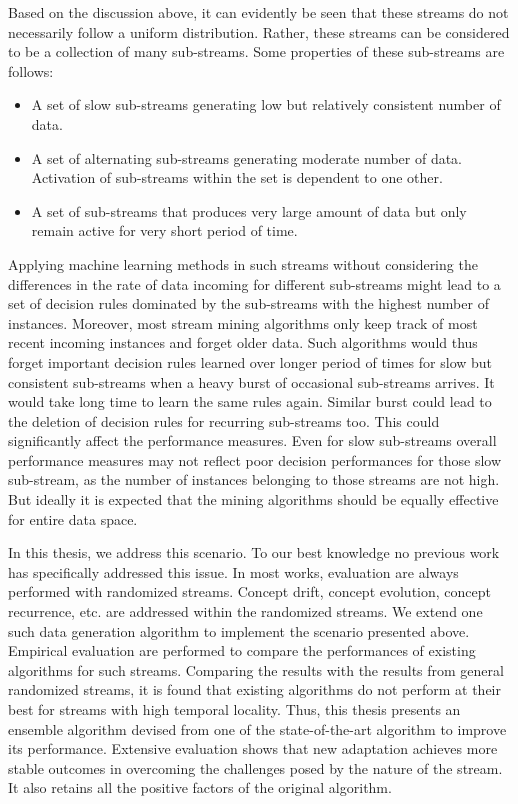 Based on the discussion above, it can evidently be seen that these streams do not necessarily follow a uniform distribution. Rather, these streams can be considered to be a collection of many sub-streams. Some properties of these sub-streams are follows:
\begin{itemize}
    \item A set of slow sub-streams generating low but relatively consistent number of data.
    \item A set of alternating sub-streams generating moderate number of data. Activation of sub-streams within the set is dependent to one other.
    \item A set of sub-streams that produces very large amount of data but only remain active for very short period of time.
\end{itemize}

Applying machine learning methods in such streams without considering the differences in the rate of data incoming for different sub-streams might lead to a set of decision rules dominated by the sub-streams with the highest number of instances. Moreover, most stream mining algorithms only keep track of most recent incoming instances and forget older data. Such algorithms would thus forget important decision rules learned over longer period of times for slow but consistent sub-streams when a heavy burst of occasional sub-streams arrives. It would take long time to learn the same rules again. Similar burst could lead to the deletion of decision rules for recurring sub-streams too. This could significantly affect the performance measures. Even for slow sub-streams overall performance measures may not reflect poor decision performances for those slow sub-stream, as the number of instances belonging to those streams are not high. But ideally it is expected that the mining algorithms should be equally effective for entire data space.

In this thesis, we address this scenario. To our best knowledge no previous work has specifically addressed this issue. In most works, evaluation are always performed with randomized streams. Concept drift, concept evolution, concept recurrence, etc. are addressed within the randomized streams. We extend one such data generation algorithm to implement the scenario presented above. Empirical evaluation are performed to compare the performances of existing algorithms for such streams. Comparing the results with the results from general randomized streams, it is found that existing algorithms do not perform at their best for streams with high temporal locality. Thus, this thesis presents an ensemble algorithm devised from one of the state-of-the-art algorithm to improve its performance. Extensive evaluation shows that new adaptation achieves more stable outcomes in overcoming the challenges posed by the nature of the stream. It also retains all the positive factors of the original algorithm.

